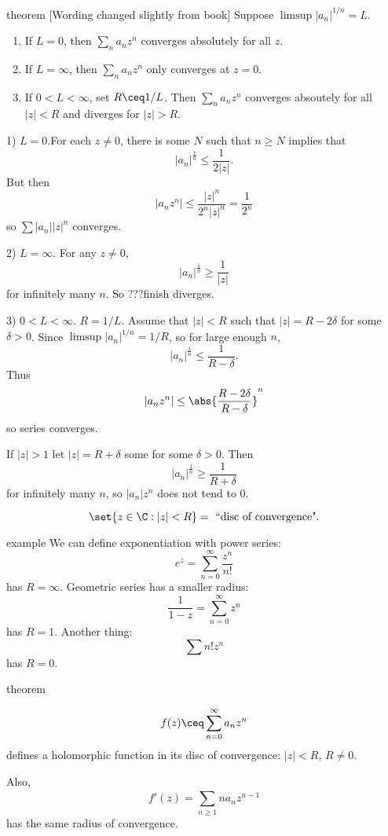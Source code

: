 \documentclass[class=article, crop=false]{standalone}
\begin{document}
\begin{result}{theorem}
  [Wording changed slightly from book] Suppose $\limsup |a_n|^{1/n} = L$.
    \begin{enumerate}[(1)]
      \item If $L=0$, then $\sum_{n}^{} a_n z^n$ converges absolutely for all $z$.
      \item If $L = \infty$, then $\sum_{n}^{} a_n z^n$ only converges at $z=0$.
      \item If $0 < L <\infty$, set $R \ceq 1/L$. Then $\sum_{n}^{} a_nz^n$ converges absoutely for all $|z| < R$ and diverges for $|z|> R$.
    \end{enumerate}
\end{result}
\begin{pf}
  1) $L = 0$.For each $z \neq 0$, there is some $N$ such that $n \geq N$ implies that
    \[
      |a_n|^{\frac{1}{n}} \leq \frac{1}{2|z|}.
    \]
  But then
    \[
      |a_nz^n| \leq \frac{|z|^n}{2^n|z|^n} = \frac{1}{2^n}
    \]
  so $\sum |a_n||z|^n$ converges.

  2) $L = \infty$. For any $z \neq 0$,
    \[
      |a_n|^{\frac{1}{n}} \geq \frac{1}{|z|}
    \]
  for infinitely many $n$. So ???finish diverges.

  3) $0 < L < \infty$. $R = 1/L$. Assume that $|z| < R$ such that $|z| = R-2\delta$ for some $\delta > 0$. Since $\limsup |a_n|^{1/n} = 1/R$, so for large enough $n$,
    \[
      |a_n|^{\frac{1}{n}} \leq \frac{1}{R-\delta}.
    \]
  Thus
    \[
      |a_nz^n| \leq \abs{\frac{R-2\delta}{R-\delta}}^n
    \]
  so series converges.

  If $|z|> 1$ let $|z| = R+\delta$ some for some $\delta > 0$. Then
    \[
      |a_n|^{\frac{1}{n}} \geq \frac{1}{R+\delta}
    \]
  for infinitely many $n$, so $|a_n|z^n$ does not tend to $0$.
\end{pf}
\[
  \set{z \in \C : |z| < R} = \text{ ``disc of convergence"}.
\]

\begin{understandingcheck}{example}
We can define exponentiation with power series:
  \[
    e^z = \sum_{n=0}^{\infty} \frac{z^n}{n!}
  \]
has $R = \infty$. Geometric series has a smaller radius:
  \[
    \frac{1}{1-z}= \sum_{n=0}^{\infty} z^n
  \]
has $R = 1$. Another thing:
  \[
    \sum n!z^n
  \]
has $R = 0$.
\end{understandingcheck}

\begin{result}{theorem}

    \[
      f(z) \ceq \sum_{n=0}^{\infty} a_nz^n
    \]
  defines a holomorphic function in its disc of convergence: $|z| < R$, $R \neq 0$.

  Also,
    \[
      f'(z) = \sum_{n \geq 1}^{} n a_n z^{n-1}
    \]
  has the same radius of convergence.
\end{result}
\end{document}

